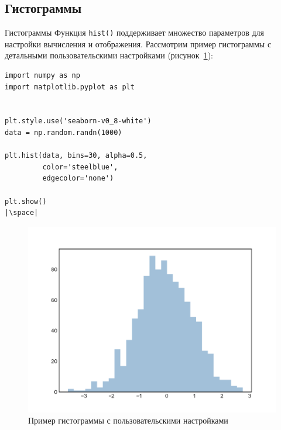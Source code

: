 \documentclass[aspectratio=169, mathserif]{beamer}	%
\begin{document}
\subsection{Гистограммы}
\begin{frame}[fragile, label=m]{Гистограммы}
\scriptsize
Функция \texttt{hist()} поддерживает множество параметров для настройки вычисления и отображения. Рассмотрим пример гистограммы с детальными пользовательскими настройками (рисунок~\ref{fig:fig_20}):
\vfill
\begin{minipage}{.4\textwidth}
\begin{verbatim}
import numpy as np
import matplotlib.pyplot as plt


plt.style.use('seaborn-v0_8-white')
data = np.random.randn(1000)

plt.hist(data, bins=30, alpha=0.5,
         color='steelblue',
         edgecolor='none')

plt.show()
|\space|
\end{verbatim}
\end{minipage}
\begin{minipage}{.59\textwidth}
\begin{figure}[h!]
	\centering
	\includegraphics[width=.85\linewidth]{./pics/Figure_20}
	\caption{Пример гистограммы с пользовательскими настройками}
	\label{fig:fig_20}
\end{figure}
\end{minipage}
\vfill
\end{frame}
\end{document}
